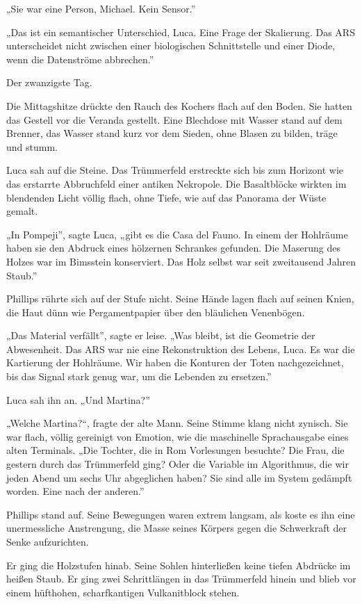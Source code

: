 \documentclass[
  ngerman,
]{article}
\begin{document}
„Sie war eine Person, Michael. Kein Sensor.''

„Das ist ein semantischer Unterschied, Luca. Eine Frage der Skalierung.
Das ARS unterscheidet nicht zwischen einer biologischen Schnittstelle
und einer Diode, wenn die Datenströme abbrechen.''

Der zwanzigste Tag.

Die Mittagshitze drückte den Rauch des Kochers flach auf den Boden. Sie
hatten das Gestell vor die Veranda gestellt. Eine Blechdose mit Wasser
stand auf dem Brenner, das Wasser stand kurz vor dem Sieden, ohne Blasen
zu bilden, träge und stumm.

Luca sah auf die Steine. Das Trümmerfeld erstreckte sich bis zum
Horizont wie das erstarrte Abbruchfeld einer antiken Nekropole. Die
Basaltblöcke wirkten im blendenden Licht völlig flach, ohne Tiefe, wie
auf das Panorama der Wüste gemalt.

„In Pompeji'', sagte Luca, „gibt es die Casa del Fauno. In einem der
Hohlräume haben sie den Abdruck eines hölzernen Schrankes gefunden. Die
Maserung des Holzes war im Bimsstein konserviert. Das Holz selbst war
seit zweitausend Jahren Staub.''

Phillips rührte sich auf der Stufe nicht. Seine Hände lagen flach auf
seinen Knien, die Haut dünn wie Pergamentpapier über den bläulichen
Venenbögen.

„Das Material verfällt'', sagte er leise. „Was bleibt, ist die Geometrie
der Abwesenheit. Das ARS war nie eine Rekonstruktion des Lebens, Luca.
Es war die Kartierung der Hohlräume. Wir haben die Konturen der Toten
nachgezeichnet, bis das Signal stark genug war, um die Lebenden zu
ersetzen.''

Luca sah ihn an. „Und Martina?''

„Welche Martina?``, fragte der alte Mann. Seine Stimme klang nicht
zynisch. Sie war flach, völlig gereinigt von Emotion, wie die
maschinelle Sprachausgabe eines alten Terminals. „Die Tochter, die in
Rom Vorlesungen besuchte? Die Frau, die gestern durch das Trümmerfeld
ging? Oder die Variable im Algorithmus, die wir jeden Abend um sechs Uhr
abgeglichen haben? Sie sind alle im System gedämpft worden. Eine nach
der anderen.''

Phillips stand auf. Seine Bewegungen waren extrem langsam, als koste es
ihn eine unermessliche Anstrengung, die Masse seines Körpers gegen die
Schwerkraft der Senke aufzurichten.

Er ging die Holzstufen hinab. Seine Sohlen hinterließen keine tiefen
Abdrücke im heißen Staub. Er ging zwei Schrittlängen in das Trümmerfeld
hinein und blieb vor einem hüfthohen, scharfkantigen Vulkanitblock
stehen.
\end{document}
